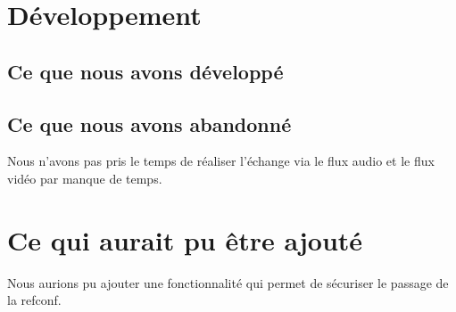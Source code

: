 \documentclass[11pt,dvipsnames,svgnames]{report}
\begin{document}
\section{Développement}
\subsection{Ce que nous avons développé}
\subsection{Ce que nous avons abandonné}
Nous n'avons pas pris le temps de réaliser l'échange via le flux audio et le flux vidéo par manque de temps.
\section{Ce qui aurait pu être ajouté}
Nous aurions pu ajouter une fonctionnalité qui permet de sécuriser le passage de la refconf.
\end{document}
